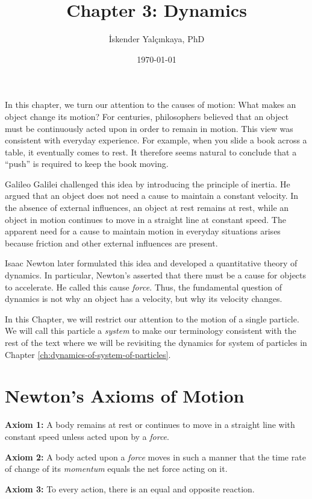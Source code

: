 \documentclass[12pt]{article}
\title{Chapter 3: Dynamics}
\author{İskender Yalçınkaya, PhD}
\date{\today}
\begin{document}
\maketitle
In this chapter, we turn our attention to the causes of motion: What makes an object change its motion? For centuries, philosophers believed that an object must be continuously acted upon in order to remain in motion. This view was consistent with everyday experience. For example, when you slide a book across a table, it eventually comes to rest. It therefore seems natural to conclude that a ``push'' is required to keep the book moving.

Galileo Galilei challenged this idea by introducing the principle of inertia. He argued that an object does not need a cause to maintain a constant velocity. In the absence of external influences, an object at rest remains at rest, while an object in motion continues to move in a straight line at constant speed. The apparent need for a cause to maintain motion in everyday situations arises because friction and other external influences are present.

Isaac Newton later formulated this idea and developed a quantitative theory of dynamics. In particular, Newton's asserted that there must be a cause for objects to accelerate. He called this cause \emph{force}. Thus, the fundamental question of dynamics is not why an object has a velocity, but why its velocity changes.

In this Chapter, we will restrict our attention to the motion of a single particle. We will call this particle a \emph{system} to make our terminology consistent with the rest of the text where we will be revisiting the dynamics for system of particles in Chapter \ref{ch:dynamics-of-system-of-particles}.

\section{Newton's Axioms of Motion}

\textbf{Axiom 1:} A body remains at rest or continues to move in a straight line with constant speed unless acted upon by a \emph{force}. 

\textbf{Axiom 2:} A body acted upon a \emph{force} moves in such a manner that the time rate of change of its \emph{momentum} equals the net force acting on it.

\textbf{Axiom 3:}  To every action, there is an equal and opposite reaction. 
\end{document}
